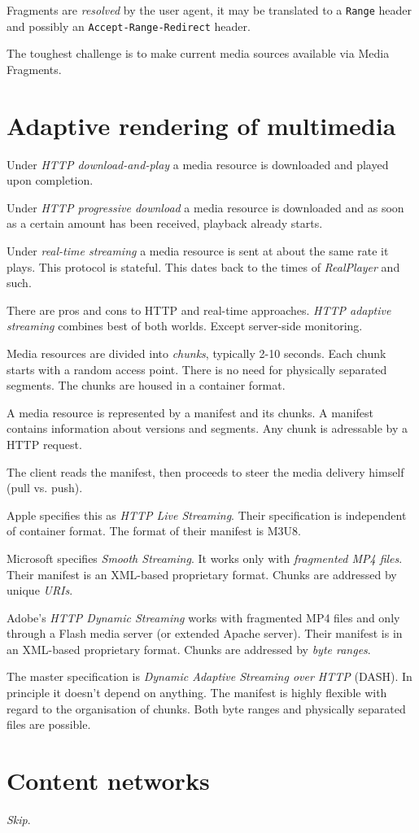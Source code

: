 \documentclass{report}
\begin{document}
Fragments are \emph{resolved} by the user agent,
it may be translated to a \texttt{Range} header
and possibly an \texttt{Accept-Range-Redirect} header.

The toughest challenge is
to make current media sources
available via Media Fragments.

\section{Adaptive rendering of multimedia}

Under \emph{HTTP download-and-play} a media resource is
downloaded and played upon completion.

Under \emph{HTTP progressive download} a media resource is
downloaded and as soon as
a certain amount has been received,
playback already starts.

Under \emph{real-time streaming} a media resource is
sent at about the same rate it plays.
This protocol is stateful.
This dates back to the times
of \emph{RealPlayer} and such.

There are pros and cons
to HTTP and real-time approaches.
\emph{HTTP adaptive streaming} combines
best of both worlds.
Except server-side monitoring.

Media resources are divided into \emph{chunks},
typically 2-10 seconds.
Each chunk starts with a random access point.
There is no need
for physically separated segments.
The chunks are housed in a container format.

A media resource is represented
by a manifest and its chunks.
A manifest contains information
about versions and segments.
Any chunk is adressable
by a HTTP request.

The client reads the manifest, then proceeds
to steer the media delivery himself (pull vs. push).

Apple specifies this as \emph{HTTP Live Streaming}.
Their specification is independent of container format.
The format of their manifest is M3U8.

Microsoft specifies \emph{Smooth Streaming}.
It works only with \emph{fragmented MP4 files}.
Their manifest is an XML-based proprietary format.
Chunks are addressed by unique \emph{URIs}.

Adobe's \emph{HTTP Dynamic Streaming} works
with fragmented MP4 files
and only through a Flash media server
(or extended Apache server).
Their manifest is in an XML-based proprietary format.
Chunks are addressed by \emph{byte ranges}.

The master specification is
\emph{Dynamic Adaptive Streaming over HTTP} (DASH).
In principle it doesn't depend on anything.
The manifest is highly flexible
with regard to the organisation of chunks.
Both byte ranges and physically separated files are possible.

\section{Content networks}

\textit{Skip}.
\end{document}
